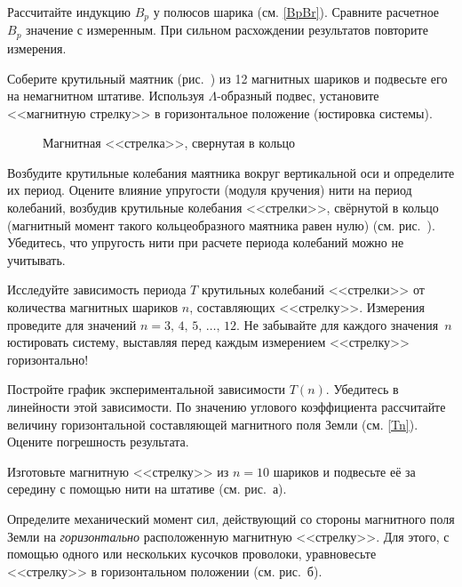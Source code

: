 \begin{lab:task}
\item Рассчитайте индукцию $B_p$ у полюсов шарика (см. \eqref{BpBr}). 
Сравните расчетное~$B_p$ значение с измеренным. 
При сильном расхождении результатов повторите измерения.


\item Соберите крутильный маятник (рис.~) из 12 магнитных шариков
и подвесьте его на немагнитном штативе.
Используя $\Lambda$-образный подвес, установите <<магнитную стрелку>>
 в горизонтальное положение (юстировка системы). 

\begin{figure}[h!]
   \centering
   \caption{Магнитная <<стрелка>>, свернутая в кольцо}       
\end{figure}

\item Возбудите крутильные колебания маятника вокруг вертикальной оси 
и определите их период. Оцените влияние упругости (модуля кручения) нити 
на период колебаний, 
возбудив крутильные колебания <<стрелки>>, свёрнутой в кольцо 
(магнитный момент такого кольцеобразного маятника равен нулю) 
(см. рис.~). Убедитесь, что упругость нити при расчете 
периода колебаний можно не учитывать.

\item Исследуйте зависимость периода $T$ крутильных колебаний <<стрелки>> 
от количества магнитных шариков $n$, составляющих <<стрелку>>. Измерения
проведите для значений  $n=3,\,4,\,5,\,\dots,\,12$. Не забывайте для каждого
значения~$n$ юстировать систему, выставляя перед каждым измерением <<стрелку>>
горизонтально!

\item Постройте график экспериментальной зависимости $T(n)$.
Убедитесь в линейности этой зависимости. 
По значению углового коэффициента рассчитайте 
величину горизонтальной составляющей магнитного поля Земли (см. \eqref{Tn}).  
Оцените погрешность результата.


\item Изготовьте магнитную <<стрелку>> из $n=10$ шариков 
и подвесьте её за середину с помощью нити на штативе (см. рис.~а).
 
\item Определите механический момент сил, действующий со стороны магнитного поля
Земли на \emph{горизонтально} расположенную магнитную <<стрелку>>. 
Для этого, с помощью одного или нескольких кусочков проволоки, 
уравновесьте <<стрелку>> в горизонтальном положении
(см. рис.~б). 


\end{lab:task}
